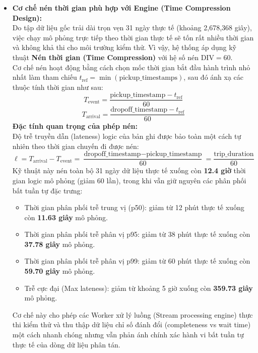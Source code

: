 \documentclass[12pt,a4paper]{article}
\begin{document}
\begin{itemize}[leftmargin=*]
    \item \textbf{Cơ chế nén thời gian phù hợp với Engine (Time Compression Design):} \\
    Do tập dữ liệu gốc trải dài trọn vẹn 31 ngày thực tế (khoảng 2,678,368 giây), việc chạy mô phỏng trực tiếp theo thời gian thực tế sẽ tốn rất nhiều thời gian và không khả thi cho môi trường kiểm thử. Vì vậy, hệ thống áp dụng kỹ thuật \textbf{Nén thời gian (Time Compression)} với hệ số nén $\text{DIV} = 60$. \\
    Cơ chế nén hoạt động bằng cách chọn mốc thời gian bắt đầu hành trình nhỏ nhất làm tham chiếu $t_{\text{ref}} = \min(\text{pickup\_timestamps})$, sau đó ánh xạ các thuộc tính thời gian như sau:
    {\large
    \begin{equation}
        \boxed{\displaystyle T_{\text{event}} = \frac{\text{pickup\_timestamp} - t_{\text{ref}}}{60}}
    \end{equation}
    }
    {\large
    \begin{equation}
        \boxed{\displaystyle T_{\text{arrival}} = \frac{\text{dropoff\_timestamp} - t_{\text{ref}}}{60}}
    \end{equation}
    }
    \textbf{Đặc tính quan trọng của phép nén:} \\
    Độ trễ truyền dẫn (lateness) logic của bản ghi được bảo toàn một cách tự nhiên theo thời gian chuyến đi được nén:
    {\large
    \begin{equation}
        \boxed{\displaystyle \ell = T_{\text{arrival}} - T_{\text{event}} = \frac{\text{dropoff\_timestamp} - \text{pickup\_timestamp}}{60} = \frac{\text{trip\_duration}}{60}}
    \end{equation}
    }
    Kỹ thuật này nén toàn bộ 31 ngày dữ liệu thực tế xuống còn \textbf{12.4 giờ} thời gian logic mô phỏng (giảm 60 lần), trong khi vẫn giữ nguyên các phân phối bất tuần tự đặc trưng:
    \begin{itemize}[label={-}]
        \item Thời gian phân phối trễ trung vị (p50): giảm từ 12 phút thực tế xuống còn \textbf{11.63 giây} mô phỏng.
        \item Thời gian phân phối trễ phân vị p95: giảm từ 38 phút thực tế xuống còn \textbf{37.78 giây} mô phỏng.
        \item Thời gian phân phối trễ phân vị p99: giảm từ 60 phút thực tế xuống còn \textbf{59.70 giây} mô phỏng.
        \item Trễ cực đại (Max lateness): giảm từ khoảng 5 giờ xuống còn \textbf{359.73 giây} mô phỏng.
    \end{itemize}
    Cơ chế này cho phép các Worker xử lý luồng (Stream processing engine) thực thi kiểm thử và thu thập dữ liệu chỉ số đánh đổi (completeness vs wait time) một cách nhanh chóng nhưng vẫn phản ánh chính xác hành vi bất tuần tự thực tế của dòng dữ liệu phân tán.


\end{itemize}
\end{document}
